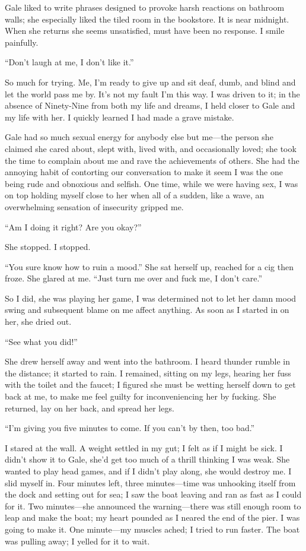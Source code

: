 Gale liked to write phrases designed to provoke harsh reactions on
bathroom walls; she especially liked the tiled room in the bookstore. It
is near midnight. When she returns she seems unsatisfied, must have been
no response. I smile painfully.

``Don't laugh at me, I don't like it.''

So much for trying. Me, I'm ready to give up and sit deaf, dumb, and
blind and let the world pass me by. It's not my fault I'm this way. I
was driven to it; in the absence of Ninety-Nine from both my life and
dreams, I held closer to Gale and my life with her. I quickly learned I
had made a grave mistake.

Gale had so much sexual energy for anybody else but me---the person she
claimed she cared about, slept with, lived with, and occasionally loved;
she took the time to complain about me and rave the achievements of
others. She had the annoying habit of contorting our conversation to
make it seem I was the one being rude and obnoxious and selfish. One
time, while we were having sex, I was on top holding myself close to her
when all of a sudden, like a wave, an overwhelming sensation of
insecurity gripped me.

``Am I doing it right? Are you okay?''

She stopped. I stopped.

``You sure know how to ruin a mood.'' She sat herself up, reached for a
cig then froze. She glared at me. ``Just turn me over and fuck me, I
don't care.''

So I did, she was playing her game, I was determined not to let her damn
mood swing and subsequent blame on me affect anything. As soon as I
started in on her, she dried out.

``See what you did!''

She drew herself away and went into the bathroom. I heard thunder rumble
in the distance; it started to rain. I remained, sitting on my legs,
hearing her fuss with the toilet and the faucet; I figured she must be
wetting herself down to get back at me, to make me feel guilty for
inconveniencing her by fucking. She returned, lay on her back, and
spread her legs.

``I'm giving you five minutes to come. If you can't by then, too bad.''

I stared at the wall. A weight settled in my gut; I felt as if I might
be sick. I didn't show it to Gale, she'd get too much of a thrill
thinking I was weak. She wanted to play head games, and if I didn't play
along, she would destroy me. I slid myself in. Four minutes left, three
minutes---time was unhooking itself from the dock and setting out for
sea; I saw the boat leaving and ran as fast as I could for it. Two
minutes---she announced the warning---there was still enough room to
leap and make the boat; my heart pounded as I neared the end of the
pier. I was going to make it. One minute---my muscles ached; I tried to
run faster. The boat was pulling away; I yelled for it to wait.

